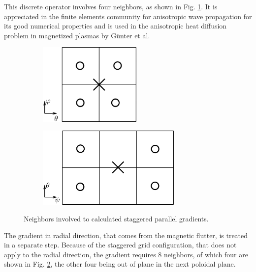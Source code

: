 This discrete operator involves four neighbors, as shown in Fig. \ref{fig:Impl_GradPara_ThetaPhi}. It is appreciated in the finite elements community for anisotropic wave propagation\cite{yee1966numerical,rubio2014finite, hasegawa2012staggered} for its good numerical properties and is used in the anisotropic heat diffusion problem in magnetized plasmas by Günter et al\cite{gunter2005}.


\begin{figure}[H]
	\centering
	\begin{subfigure}[t]{0.40\textwidth}
		\centering
		\includegraphics[height=40mm]{schemes/GradientStencil_ThetaPhi.png}
		\label{fig:Impl_GradPara_ThetaPhi}
	\end{subfigure}
	\begin{subfigure}[t]{0.55\textwidth}
		\centering
		\includegraphics[height=40mm]{schemes/GradientStencil_PsiTheta.png}
		\label{fig:Impl_GradPara_PsiTheta}
	\end{subfigure}
	\caption[Neighbors involved to calculated staggered parallel gradients]{Neighbors involved to calculated staggered parallel gradients.}
	\label{fig:Impl_GradPara}
\end{figure}

The gradient in radial direction, that comes from the magnetic flutter, is treated in a separate step. Because of the staggered grid configuration, that does not apply to the radial direction, the gradient requires 8 neighbors, of which four are shown in Fig. \ref{fig:Impl_GradPara_PsiTheta}, the other four being out of plane in the next poloidal plane.


